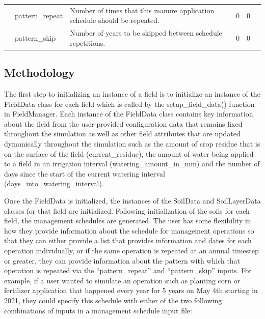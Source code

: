 \begin{landscape}
\begin{longtable}{@{} L{3.5cm} L{4cm} L{6cm} p{1.2cm} p{1.2cm} p{1.2cm} @{}}
 & pattern\_repeat & Number of times that this manure application schedule should be repeated. & 0 & 0 &   \\
 & pattern\_skip & Number of years to be skipped between schedule repetitions. & 0 & 0 &   \\



\end{longtable}
\end{landscape}



\subsection{Methodology}

The first step to initializing an instance of a field is to initialize an instance of the FieldData class for each field which is called by the setup\_field\_data() function in FieldManager. Each instance of the FieldData class contains key information about the field from the user-provided configuration data that remains fixed throughout the simulation as well as other field attributes that are updated dynamically throughout the simulation such as the amount of crop residue that is on the surface of the field (current\_residue), the amount of water being applied to a field in an irrigation interval (watering\_amount\_in\_mm) and the number of days since the start of the current watering interval (days\_into\_watering\_interval). 
\vspace{0.2cm}

Once the FieldData is initialized, the instances of the SoilData and SoilLayerData classes for that field are initialized.  Following initialization of the soils for each field, the management schedules are generated. The user has some flexibility in how they provide information about the schedule for management operations so that they can either provide a list that provides information and dates for each operation individually, or if the same operation is repeated at an annual timestep or greater, they can provide information about the pattern with which that operation is repeated via the “pattern\_repeat” and “pattern\_skip” inputs. For example, if a user wanted to simulate an operation such as planting corn or fertilizer application that happened every year for 5 years on May 4th starting in 2021, they could specify this schedule with either of the two following combinations of inputs in a management schedule input file:

